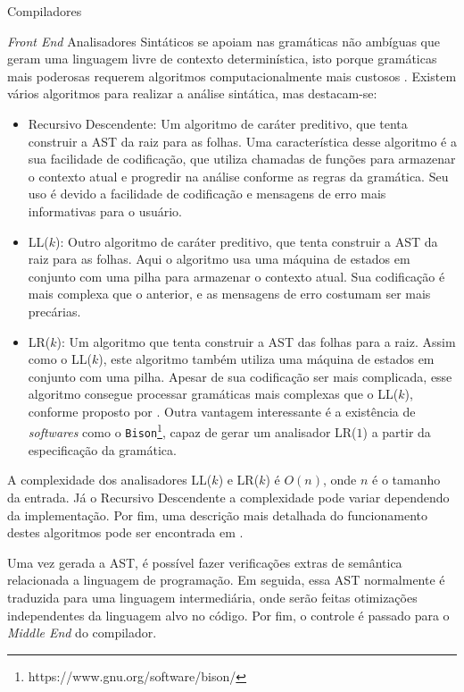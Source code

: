 \begin{section}{Compiladores}
\begin{subsection}{\textit{Front End}}
    Analisadores Sintáticos se apoiam nas gramáticas não ambíguas que geram uma
linguagem livre de contexto determinística, isto porque gramáticas mais
poderosas requerem algoritmos computacionalmente mais custosos
\citep{sipser2012}. Existem vários algoritmos para realizar a análise sintática,
mas destacam-se:
\begin{itemize}
	\item Recursivo Descendente: Um algoritmo de caráter preditivo, que tenta
	    construir a AST da raiz para as folhas. Uma característica desse algoritmo
		é a sua facilidade de codificação, que utiliza chamadas de funções para
		armazenar o contexto atual e progredir na análise conforme as regras da
		gramática. Seu uso é devido a facilidade de codificação e mensagens de
		erro mais informativas para o usuário.

    \item LL($k$): Outro algoritmo de caráter preditivo, que tenta construir a AST da
        raiz para as folhas. Aqui o algoritmo usa uma máquina de estados em conjunto
		com uma pilha para armazenar o contexto atual. Sua codificação é mais
		complexa que o anterior, e as mensagens de erro costumam ser mais precárias.

    \item LR($k$): Um algoritmo que tenta construir a AST das folhas para a raiz.
		  Assim como o LL($k$), este algoritmo também utiliza uma máquina de estados
		  em conjunto com uma pilha. Apesar de sua codificação ser mais complicada,
          esse algoritmo consegue processar gramáticas mais complexas que
          o LL($k$), conforme proposto por \cite{knuth1965translation}. 
          Outra vantagem interessante é a existência de
          \textit{softwares} como o
          \texttt{Bison}\footnote{https://www.gnu.org/software/bison/}, capaz
          de gerar um analisador LR($1$) a partir da especificação da gramática.
\end{itemize}
	A complexidade dos analisadores LL($k$) e LR($k$) é $O(n)$, onde $n$ 
	é o tamanho da entrada. Já o Recursivo Descendente a complexidade pode variar
	dependendo da implementação.
    Por fim, uma descrição mais detalhada do funcionamento destes algoritmos
pode ser encontrada em \citep{appel2004modern}.

    Uma vez gerada a AST, é possível fazer verificações extras de semântica
relacionada a linguagem de programação. Em seguida, essa AST normalmente é
traduzida para uma linguagem intermediária, onde serão feitas otimizações
independentes da linguagem alvo no código. Por fim, o controle é passado
para o \textit{Middle End} do compilador.


\end{subsection}
\end{section}
